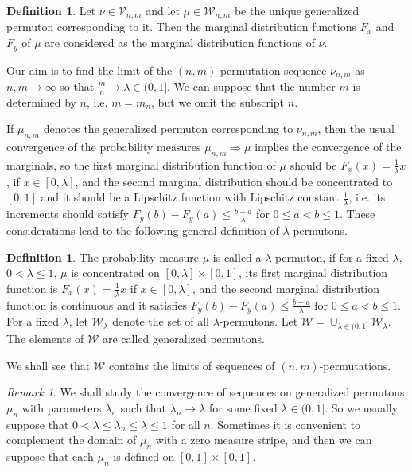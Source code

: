 \documentclass[12pt,twoside]{article}
\theoremstyle{definition}
\newtheorem{definition}[theorem]{Definition}
\theoremstyle{remark}
\numberwithin{equation}{section}
\theoremstyle{plain}
\theoremstyle{remark}
\newtheorem{rem}{Remark}[section]
\def\VD{{\mathcal V}}
\def\WD{{\mathcal W}}
\begin{document}
\begin{definition}
Let $\nu \in \VD_{n,m}$ and let $\mu \in \WD_{n,m}$ be the unique generalized 
permuton corresponding to it.
Then the marginal distribution functions $F_x$ and $F_y$ of $\mu$ are considered as the marginal
distribution functions of $\nu$.
\end{definition}
%

Our aim is to find the limit of the $(n,m)$-permutation sequence $\nu_{n,m}$ as $n,m \to \infty$ so that 
$\frac{m}{n} \to \lambda \in (0,1]$.
We can suppose that the number $m$ is determined by $n$, i.e. $m=m_n$, but we omit the subscript $n$.

If $\mu_{n,m}$ denotes the generalized permuton corresponding to $\nu_{n,m}$,
then the usual convergence of the probability measures $\mu_{n,m} \Rightarrow  \mu$
implies the convergence of the marginals,
so the first marginal distribution function of $\mu$ should be
$F_x(x) =\frac{1}{\lambda}x$, if $x\in [0, \lambda]$, 
and the second marginal distribution should be concentrated to $[0,1]$ and it should be 
a Lipschitz function with Lipschitz constant $\frac{1}{\lambda}$, i.e. its increments should satisfy
$F_y(b) -F_y(a) \le \frac{b-a}{\lambda}$ for $0\le a < b \le 1$.
These considerations lead to the following general definition of $\lambda$-permutons.
%

\begin{definition}
The probability measure $\mu$ is called a $\lambda$-permuton, 
if for a fixed $\lambda$, $0<\lambda\le 1$,
 $\mu$ is concentrated on $[0, \lambda] \times [0,1]$,
its first marginal distribution function is
$F_x(x) =\frac{1}{\lambda}x $ if $x\in [0, \lambda]$, 
and the second marginal distribution function is continuous and it
 satisfies
$F_y(b) -F_y(a) \le \frac{b-a}{\lambda}$ for $0\le a < b \le 1$.
For a fixed $\lambda$, let $\WD_{\lambda}$ denote the set of all $\lambda$-permutons.
Let $\WD = \cup_{\lambda\in (0,1]} \WD_{\lambda}$.
The elements of $\WD$ are called generalized permutons.
\end{definition}
% 
 
We shall see that $\WD$ contains the limits of sequences of $(n,m)$-permutations.
%  

\begin{rem}
We shall study the convergence of sequences on generalized 
permutons $\mu_{n}$ with parameters
$\lambda_n$ such that $\lambda_n  \to \lambda$ for some fixed $\lambda \in (0,1]$.
So we usually suppose that $0< \underline{\lambda} \le \lambda_n \le \overline{\lambda} \le 1$ 
for all $n$.
Sometimes it is convenient to complement the domain of $\mu_{n}$ with a zero measure stripe, 
and then we can suppose that each $\mu_{n}$ is defined on $[0, 1] \times [0,1]$. 
   \end{rem}  
% 
  
\end{document}

